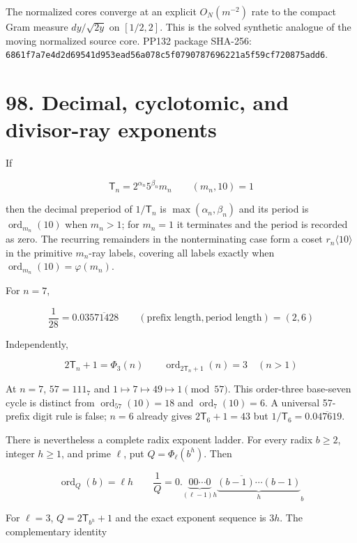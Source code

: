 \documentclass[
  11pt,
]{book}
\begin{document}
The normalized cores converge at an explicit \(O_N(m^{-2})\) rate to the
compact Gram measure \(dy/\sqrt{2y}\) on \([1/2,2]\). This is the solved
synthetic analogue of the moving normalized source core. PP132 package
SHA-256:
\texttt{6861f7a7e4d2d695}\allowbreak \texttt{41d953ead56a078c}\allowbreak \texttt{5f0790787696221a}\allowbreak \texttt{5f59cf720875add6}.

\section{98. Decimal, cyclotomic, and divisor-ray
exponents}\label{decimal-cyclotomic-and-divisor-ray-exponents}

If

\[
\mathsf T_n=2^{\alpha_n}5^{\beta_n}m_n
\qquad(m_n,10)=1
\]

then the decimal preperiod of \(1/\mathsf T_n\) is
\(\max(\alpha_n,\beta_n)\) and its period is
\(\operatorname{ord}_{m_n}(10)\) when \(m_n>1\); for \(m_n=1\) it
terminates and the period is recorded as zero. The recurring remainders
in the nonterminating case form a coset \(r_n\langle10\rangle\) in the
primitive \(m_n\)-ray labels, covering all labels exactly when
\(\operatorname{ord}_{m_n}(10)=\varphi(m_n)\).

For \(n=7\),

\[
\frac1{28}=0.03\overline{571428}
\qquad(\text{prefix length},\text{period length})=(2,6)
\tag{98.1}
\]

Independently,

\[
\boxed{
2\mathsf T_n+1=\Phi_3(n)
\qquad
\operatorname{ord}_{2\mathsf T_n+1}(n)=3\quad(n>1)
}
\tag{98.2}
\]

At \(n=7\), \(57=111_7\) and \(1\mapsto7\mapsto49\mapsto1\pmod{57}\).
This order-three base-seven cycle is distinct from
\(\operatorname{ord}_{57}(10)=18\) and \(\operatorname{ord}_7(10)=6\). A
universal 57-prefix digit rule is false; \(n=6\) already gives
\(2\mathsf T_6+1=43\) but \(1/\mathsf T_6=0.\overline{047619}\).

There is nevertheless a complete radix exponent ladder. For every radix
\(b\ge2\), integer \(h\ge1\), and prime \(\ell\), put
\(Q=\Phi_\ell(b^h)\). Then

\[
\boxed{
\operatorname{ord}_{Q}(b)=\ell h
\qquad
\frac1Q
=0.\overline{
\underbrace{00\cdots0}_{(\ell-1)h}
\underbrace{(b-1)\cdots(b-1)}_{h}} _b
}
\tag{98.3}
\]

For \(\ell=3\), \(Q=2\mathsf T_{b^h}+1\) and the exact exponent sequence
is \(3h\). The complementary identity
\end{document}
